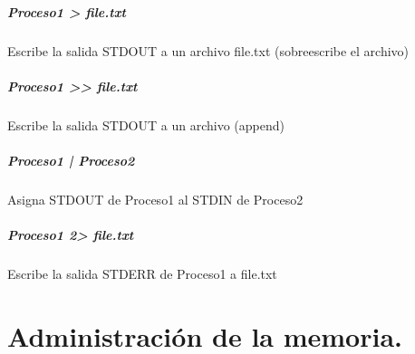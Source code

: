 \paragraph{Proceso1 \textit{>} file.txt} Escribe la salida STDOUT a un archivo file.txt (sobreescribe el archivo)\\
\paragraph{Proceso1 \textit{>>} file.txt} Escribe la salida STDOUT a un archivo (append)\\
\paragraph{Proceso1 \textit{|} Proceso2} Asigna STDOUT de Proceso1 al STDIN de Proceso2\\
\paragraph{Proceso1 \textit{2>} file.txt} Escribe la salida STDERR de Proceso1 a file.txt\\

\chapter{Administraci\'{o}n de la memoria.}
